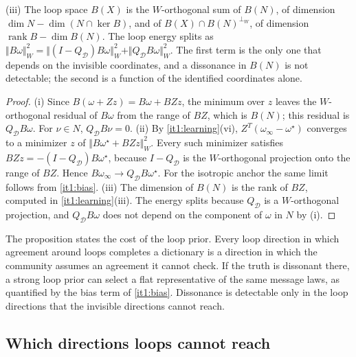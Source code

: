\textup{(iii)} The loop space $B(X)$ is the $W$-orthogonal sum of $B(N)$, of dimension $\dim N-\dim(N\cap\ker B)$, and of $B(X)\cap B(N)^{\perp_W}$, of dimension $\operatorname{rank}B-\dim B(N)$. The loop energy splits as $\Vert B\omega\Vert_W^2=\Vert(I-Q_{\mathcal D})B\omega\Vert_W^2+\Vert Q_{\mathcal D}B\omega\Vert_W^2$. The first term is the only one that depends on the invisible coordinates, and a dissonance in $B(N)$ is not detectable; the second is a function of the identified coordinates alone.
\begin{proof}
(i) Since $B(\omega+Zz)=B\omega+BZz$, the minimum over $z$ leaves the $W$-orthogonal residual of $B\omega$ from the range of $BZ$, which is $B(N)$; this residual is $Q_{\mathcal D}B\omega$. For $\nu\in N$, $Q_{\mathcal D}B\nu=0$. (ii) By \cref{it1:learning}(vi), $Z^T(\omega_\infty-\omega^\star)$ converges to a minimizer $z$ of $\Vert B\omega^\star+BZz\Vert_W^2$. Every such minimizer satisfies $BZz=-(I-Q_{\mathcal D})B\omega^\star$, because $I-Q_{\mathcal D}$ is the $W$-orthogonal projection onto the range of $BZ$. Hence $B\omega_\infty\to Q_{\mathcal D}B\omega^\star$. For the isotropic anchor the same limit follows from \cref{it1:bias}. (iii) The dimension of $B(N)$ is the rank of $BZ$, computed in \cref{it1:learning}(iii). The energy splits because $Q_{\mathcal D}$ is a $W$-orthogonal projection, and $Q_{\mathcal D}B\omega$ does not depend on the component of $\omega$ in $N$ by (i).
\end{proof}

The proposition states the cost of the loop prior. Every loop direction in which agreement around loops completes a dictionary is a direction in which the community assumes an agreement it cannot check. If the truth is dissonant there, a strong loop prior can select a flat representative of the same message laws, as quantified by the bias term of \cref{it1:bias}. Dissonance is detectable only in the loop directions that the invisible directions cannot reach.

\subsection{Which directions loops cannot reach}

